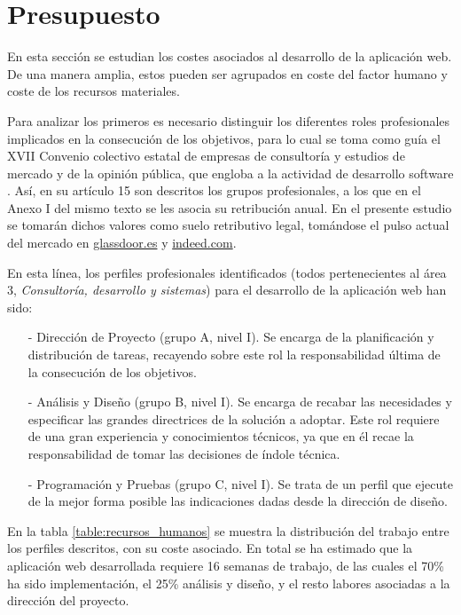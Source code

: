 \documentclass[a4paper,12pt,twoside,openright]{report}
\begin{document}
    \chapter{Presupuesto} \label{sec:budget}
    En esta sección se estudian los costes asociados al desarrollo de la aplicación web. De una manera amplia, estos pueden ser agrupados en coste del factor humano y coste de los recursos materiales.
    
    Para analizar los primeros es necesario distinguir los diferentes roles profesionales implicados en la consecución de los objetivos, para lo cual se toma como guía el XVII Convenio colectivo estatal de empresas de consultoría y estudios de mercado y de la opinión pública, que engloba a la actividad de desarrollo software \cite{EmpleoySeguridadSocial2018}. Así, en su artículo 15 son descritos los grupos profesionales, a los que en el Anexo I del mismo texto se les asocia su retribución anual. En el presente estudio se tomarán dichos valores como suelo retributivo legal, tomándose el pulso actual del mercado en \href{https://www.glassdoor.es/Sueldos/index.htm}{glassdoor.es} y \href{https://es.indeed.com/salaries}{indeed.com}.
    
    En esta línea, los perfiles profesionales identificados (todos pertenecientes al área 3, \emph{Consultoría, desarrollo y sistemas}) para el desarrollo de la aplicación web han sido:
    
    \begin{itemize}
    	\item[-] Dirección de Proyecto (grupo A, nivel I). Se encarga de la planificación y distribución de tareas, recayendo sobre este rol la responsabilidad última de la consecución de los objetivos.
    	\item[-] Análisis y Diseño (grupo B, nivel I). Se encarga de recabar las necesidades y especificar las grandes directrices de la solución a adoptar. Este rol requiere de una gran experiencia y conocimientos técnicos, ya que en él recae la responsabilidad de tomar las decisiones de índole técnica.
    	\item[-] Programación y Pruebas (grupo C, nivel I). Se trata de un perfil que ejecute de la mejor forma posible las indicaciones dadas desde la dirección de diseño.
    \end{itemize}
	
	En la tabla \ref{table:recursos_humanos} se muestra la distribución del trabajo entre los perfiles descritos, con su coste asociado. En total se ha estimado que la aplicación web desarrollada requiere 16 semanas de trabajo, de las cuales el 70\% ha sido implementación, el 25\% análisis y diseño, y el resto labores asociadas a la dirección del proyecto.
    
\end{document}
